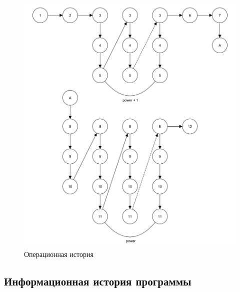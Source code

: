 \begin{figure}[h]
	\centering
	\includegraphics[height=0.7\textheight, page=1]{img/операционная_история.pdf}
	\caption{Операционная история}
\end{figure}

\clearpage

\subsection{Информационная история программы}

